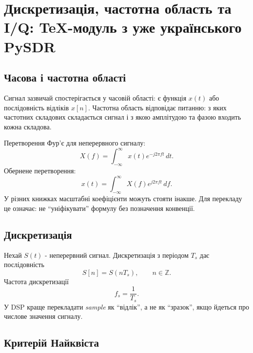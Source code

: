 \chapter{Дискретизація, частотна область та I/Q: TeX-модуль з уже українського PySDR}


\section{Часова і частотна області}

Сигнал зазвичай спостерігається у часовій області: є функція $x(t)$ або послідовність відліків $x[n]$. Частотна область відповідає питанню: з яких частотних складових складається сигнал і з якою амплітудою та фазою входить кожна складова.

Перетворення Фур'є для неперервного сигналу:
\begin{equation}\label{eq:ft_session02}
X(f)=\int_{-\infty}^{\infty}x(t)e^{-j2\pi ft}\,dt.
\end{equation}
Обернене перетворення:
\begin{equation}\label{eq:ift_session02}
x(t)=\int_{-\infty}^{\infty}X(f)e^{j2\pi ft}\,df.
\end{equation}
У різних книжках масштабні коефіцієнти можуть стояти інакше. Для перекладу це означає: не ``уніфікувати'' формулу без позначення конвенції.

\section{Дискретизація}

Нехай $S(t)$ - неперервний сигнал. Дискретизація з періодом $T_s$ дає послідовність
\begin{equation}
S[n]=S(nT_s),\qquad n\in\mathbb{Z}.
\end{equation}
Частота дискретизації
\begin{equation}
f_s=\frac{1}{T_s}.
\end{equation}
У DSP краще перекладати \emph{sample} як ``відлік'', а не як ``зразок'', якщо йдеться про числове значення сигналу.

\section{Критерій Найквіста}

